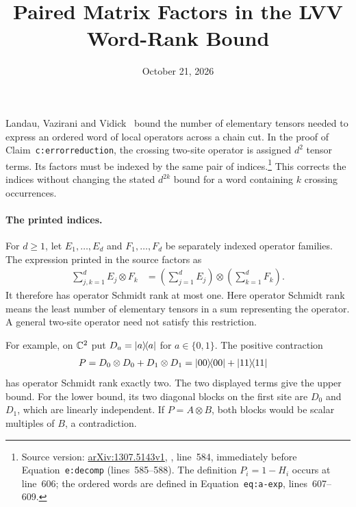 \documentclass{article}
\title{Paired Matrix Factors in the LVV Word-Rank Bound}
\author{}
\date{October 21, 2026}
\begin{document}
\maketitle
{}

Landau, Vazirani and Vidick~\cite{Landau2013PolynomialTime} bound the number
of elementary tensors needed to express an ordered word of local operators
across a chain cut. In the proof of Claim~\texttt{c:errorreduction}, the
crossing two-site operator is assigned $d^2$ tensor terms. Its factors must
be indexed by the same pair of indices.\footnote{Source version:
\href{https://arxiv.org/abs/1307.5143v1}{arXiv:1307.5143v1},
, line~584, immediately before Equation~\texttt{e:decomp}
(lines~585--588). The definition $P_i=1-H_i$ occurs at line~606;
the ordered words are defined in Equation~\texttt{eq:a-exp}, lines~607--609.}
This corrects the indices without changing the stated $d^{2k}$ bound for a
word containing $k$ crossing occurrences.

\paragraph{The printed indices.}
For $d\ge1$, let $E_1,\ldots,E_d$ and $F_1,\ldots,F_d$ be separately
indexed operator families. The expression printed in the source factors as
\begin{align}
    \sum_{j,k=1}^{d}E_j\otimes F_k
        &=\left(\sum_{j=1}^{d}E_j\right)
            \otimes\left(\sum_{k=1}^{d}F_k\right).
    \label{eq:lvv13_independent_indices}
\end{align}
It therefore has operator Schmidt rank at most one. Here operator Schmidt
rank means the least number of elementary tensors in a sum representing the
operator. A general two-site operator need not satisfy this restriction.

For example, on $\mathbb{C}^2$ put $D_a=|a\rangle\!\langle a|$ for $a\in\{0,1\}$. The
positive contraction
\begin{align}
    P&=D_0\otimes D_0+D_1\otimes D_1
      =|00\rangle\!\langle 00|+|11\rangle\!\langle 11|
    \label{eq:lvv13_projection_example}
\end{align}
has operator Schmidt rank exactly two. The two displayed terms give the
upper bound. For the lower bound, its two diagonal blocks on the first site
are $D_0$ and $D_1$, which are linearly independent. If $P=A\otimes B$,
both blocks would be scalar multiples of $B$, a contradiction.
\end{document}
